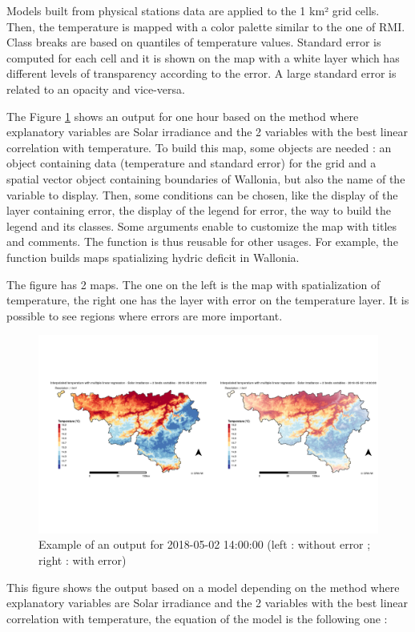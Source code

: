 \documentclass[12pt,twoside]{reedthesis}
\theoremstyle{definition}
\theoremstyle{definition}
\theoremstyle{definition}
\theoremstyle{remark}
\begin{document}
Models built from physical stations data are applied to the 1 km² grid
cells. Then, the temperature is mapped with a color palette similar to
the one of RMI. Class breaks are based on quantiles of temperature
values. Standard error is computed for each cell and it is shown on the
map with a white layer which has different levels of transparency
according to the error. A large standard error is related to an opacity
and vice-versa.

The Figure \ref{fig:map} shows an output for one hour based on the
method where explanatory variables are Solar irradiance and the 2
variables with the best linear correlation with temperature. To build
this map, some objects are needed : an object containing data
(temperature and standard error) for the grid and a spatial vector
object containing boundaries of Wallonia, but also the name of the
variable to display. Then, some conditions can be chosen, like the
display of the layer containing error, the display of the legend for
error, the way to build the legend and its classes. Some arguments
enable to customize the map with titles and comments. The function is
thus reusable for other usages. For example, the function builds maps
spatializing hydric deficit in Wallonia.

The figure has 2 maps. The one on the left is the map with
spatialization of temperature, the right one has the layer with error on
the temperature layer. It is possible to see regions where errors are
more important.
\begin{figure}
\includegraphics[width=1\linewidth]{figure/maperror} \caption{Example of an output for 2018-05-02 14:00:00 (left : without error ; right : with error)}\label{fig:map}
\end{figure}
This figure shows the output based on a model depending on the method
where explanatory variables are Solar irradiance and the 2 variables
with the best linear correlation with temperature, the equation of the
model is the following one :
\end{document}
